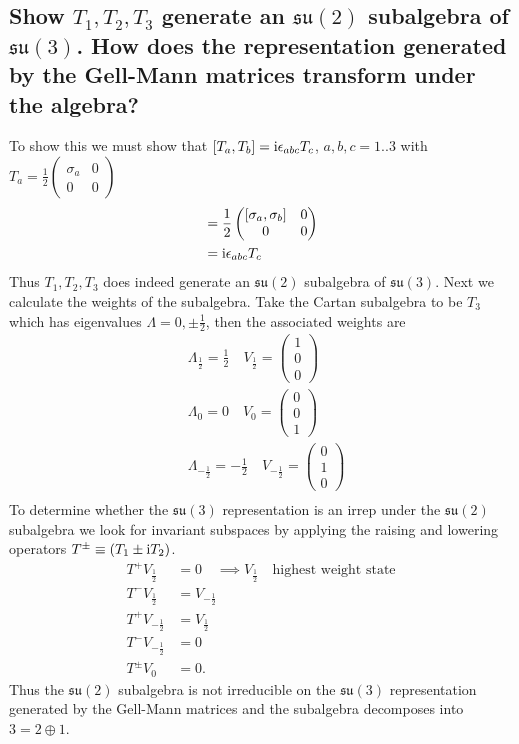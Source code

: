 \documentclass[main.tex]{subfiles}
\begin{document}
\subsection{Show $T_1, T_2, T_3$ generate an $\mathfrak{su}(2)$ subalgebra of $\mathfrak{su}(3)$. How does the representation generated by the Gell-Mann matrices transform under the algebra?}
To show this we must show that $[T_a,T_b]=\mathrm{i} \epsilon_{abc}T_c$, $a,b,c=1..3$ with $T_a=\frac{1}{2}\begin{pmatrix}\sigma_a&0\\0&0\end{pmatrix}$
\begin{align}
[T_a,T_b]&=\frac{1}{2}\begin{pmatrix}[\sigma_a,\sigma_b]&0\\0&0\end{pmatrix}\\
&=\img \epsilon_{abc}T_c
\end{align}
Thus $T_1, T_2, T_3$ does indeed generate an $\mathfrak{su}(2)$ subalgebra of $\mathfrak{su}(3)$. Next we calculate the weights of the subalgebra. Take the Cartan subalgebra to be $T_3$ which has eigenvalues $\Lambda=0,\pm\frac{1}{2}$, then the associated weights are
\begin{align}
&\Lambda_{\frac{1}{2}}=\frac{1}{2} \quad V_{\frac{1}{2}}= \begin{pmatrix}1\\0\\0\end{pmatrix}\\
&\Lambda_0=0 \quad V_0= \begin{pmatrix}0\\0\\1\end{pmatrix}\\
&\Lambda_{-\frac{1}{2}}=-\frac{1}{2} \quad V_{-\frac{1}{2}}= \begin{pmatrix}0\\1\\0\end{pmatrix}\\
\end{align}
To determine whether the $\mathfrak{su}(3)$ representation is an irrep under the $\mathfrak{su}(2)$ subalgebra we look for invariant subspaces by applying the raising and lowering operators $T^{\pm}\equiv(T_1\pm \mathrm{i} T_2)$.
\begin{align}
T^+V_{\frac{1}{2}}&=0 \quad \implies V_{\frac{1}{2}} \quad\text{highest weight state}\\
T^-V_{\frac{1}{2}}&=V_{-\frac{1}{2}}\\
T^+V_{-\frac{1}{2}}&=V_{\frac{1}{2}}\\
T^-V_{-\frac{1}{2}}&=0\\
T^{\pm}V_0&=0.
\end{align}
Thus the $\mathfrak{su}(2)$ subalgebra is not irreducible on the $\mathfrak{su}(3)$ representation generated by the Gell-Mann matrices and the subalgebra decomposes into $3=2\oplus1$.
\end{document}
